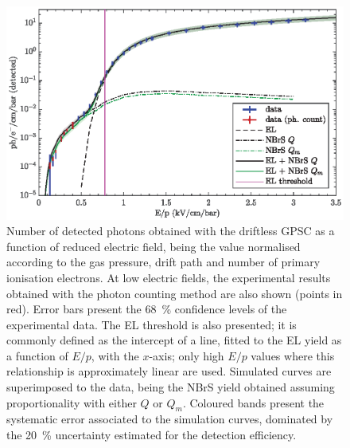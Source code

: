 \documentclass[%
 reprint,
superscriptaddress,
 amsmath,amssymb,
 aps,
]{revtex4-2}
\begin{document}
\begin{figure}[t]
\centering %
\includegraphics{Fig10.eps}
\hfill
\caption{\label{fig:nBr}Number of detected photons obtained with the driftless GPSC as a function of reduced electric field, being the value normalised according to the gas pressure, drift path and number of primary ionisation electrons. At low electric fields, the experimental results obtained with the photon counting method are also shown (points in red). Error bars present the 68~\% confidence levels of the experimental data. The EL threshold is also presented; it is commonly defined as the intercept of a line, fitted to the EL yield as a function of $E/p$, with the $x$-axis; only high $E/p$ values where this relationship is approximately linear are used. Simulated curves are superimposed to the data, being the NBrS yield obtained assuming proportionality with either $Q$ or $Q_m$. Coloured bands present the systematic error associated to the simulation curves, dominated by the 20~\% uncertainty estimated for the detection efficiency.}
\end{figure}
\end{document}

